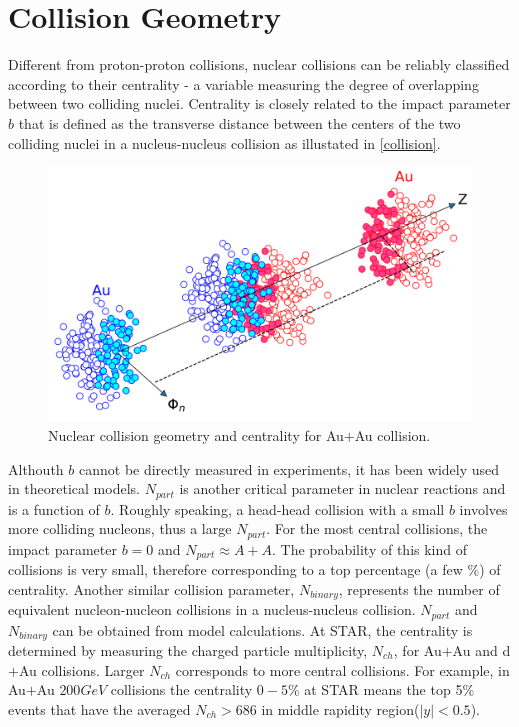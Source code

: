\section{Collision Geometry}
Different from proton-proton collisions,
nuclear collisions can be reliably classified according to their centrality - a variable measuring the degree of overlapping between two colliding nuclei.
Centrality is closely related to the impact parameter $b$ that is defined as the transverse distance between the centers of the two colliding nuclei in a nucleus-nucleus collision as illustated in \ref{collision}.
\begin{figure}[hbtp]
  \centering
  \includegraphics[width=\linewidth]{pictures/collision.pdf}
  \caption{Nuclear collision geometry and centrality for Au$+$Au collision.}
  \label{fig:collision}
\end{figure}
Althouth $b$ cannot be directly measured in experiments,
it has been widely used in theoretical models.
$N_{part}$ is another critical parameter in nuclear reactions and is a function of $b$.
Roughly speaking, a head-head collision with a small $b$ involves more colliding nucleons,
thus a large $N_{part}$.
For the most central collisions,
the impact parameter $b = 0$ and $N_{part} \approx A + A$.
The probability of this kind of collisions is very small, therefore corresponding to a top percentage (a few \%) of centrality.
Another similar collision parameter, $N_{binary}$, represents the number of equivalent nucleon-nucleon collisions in a nucleus-nucleus collision.
$N_{part}$ and $N_{binary}$ can be obtained from model calculations.
At STAR, the centrality is determined by measuring the charged particle multiplicity,
$N_{ch}$, for Au$+$Au and d$+$Au collisions.
Larger $N_{ch}$ corresponds to more central collisions.
For example, in Au$+$Au $200 GeV$ collisions the  centrality $0-5\%$ at STAR means the top 5\% events that have the averaged $N_{ch} > 686$ in middle rapidity region($|y| < 0.5$).

